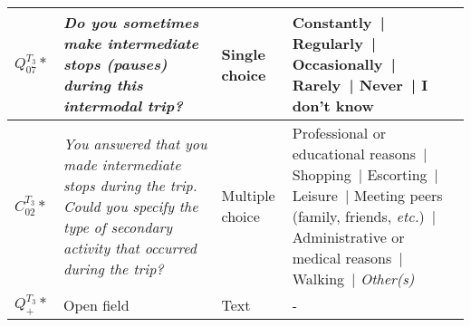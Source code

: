 \begin{table}[h!]
{\begin{tabular}{p{}p{}p{}p{}}
\hline
    \small{\textbf{\(Q_{07}^{T_{3}}*\)}} & \small{\textsl{Do you sometimes make intermediate stops (pauses) during this intermodal trip?}} & \small{Single choice} & \small{Constantly~| Regularly~| Occasionally~| Rarely~| Never~| I don't know}\\
\hline
    \small{\(C_{02}^{T_{3}}*\)} & \small{\textsl{You answered that you made intermediate stops during the trip. Could you specify the type of secondary activity that occurred during the trip?}} & \small{Multiple choice} & \small{Professional or educational reasons~| Shopping~| Escorting~| Leisure~| Meeting peers (family, friends, \textsl{etc.})~| Administrative or medical reasons~| Walking~| \textsl{Other(s)}}\\
\hline
    \small{\textbf{\(Q_{+}^{T_{3}}*\)}} & \small{Open field} & \small{Text} & \small{-}\\
      \hline
    \end{tabular}}
    \caption*{}
    \vspace{5pt}
        \end{table}

